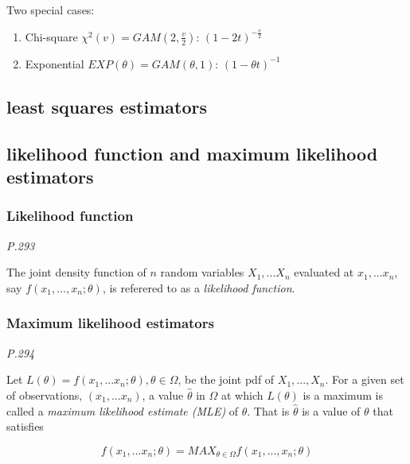 \documentclass[
]{book}
\begin{document}
Two special cases:

\begin{enumerate}
\def\labelenumi{(\arabic{enumi})}
\setcounter{enumi}{5}
\item
  Chi-square \(\chi^2(v) =GAM(2,\frac{v}{2})\): \((1-2t)^{-\frac{v}{2}}\)
\item
  Exponential \(EXP(\theta)=GAM(\theta,1)\): \((1-\theta t)^{-1}\)
\end{enumerate}

\hypertarget{least-squares-estimators}{%
\subsection{least squares estimators}\label{least-squares-estimators}}

\hypertarget{likelihood-function-and-maximum-likelihood-estimators}{%
\subsection{likelihood function and maximum likelihood estimators}\label{likelihood-function-and-maximum-likelihood-estimators}}

\hypertarget{likelihood-function}{%
\subsubsection{Likelihood function}\label{likelihood-function}}

\emph{P.293}

The joint density function of \(n\) random variables \(X_1,...X_n\) evaluated at \(x_1, ...x_n\), say \(f(x_1,...,x_n; \theta)\), is referered to as a \emph{likelihood function}.

\hypertarget{maximum-likelihood-estimators}{%
\subsubsection{Maximum likelihood estimators}\label{maximum-likelihood-estimators}}

\emph{P.294}

Let \(L(\theta)=f(x_1,...x_n; \theta), \theta \in \Omega\), be the joint pdf of \(X_1, ..., X_n\). For a given set of observations, \((x_1,...x_n)\), a value \(\hat{\theta}\) in \(\Omega\) at which \(L(\theta)\) is a maximum is called a \emph{maximum likelihood estimate (MLE)} of \(\theta\). That is \(\hat{\theta}\) is a value of \(\theta\) that satisfies

\[f(x_1,...x_n; \theta)=MAX_{\theta \in \Omega} f(x_1, ..., x_n; \theta)\]
\end{document}
